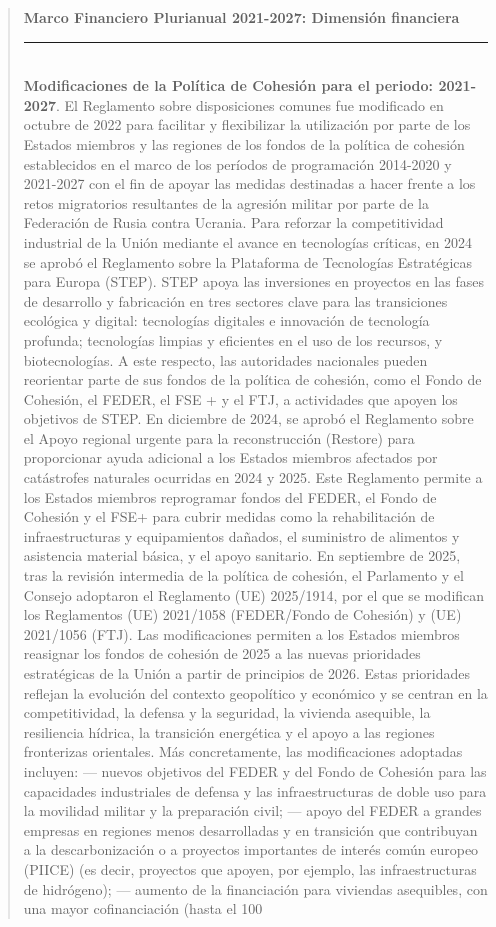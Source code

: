 \documentclass[10pt,a4paper]{article}
\newenvironment{specialblock}[1]{%
      \begin{quote} %
      \small %
      \noindent\textbf{#1}\\[-0.3em] %
      \rule{\linewidth}{0.4pt}\\[0.6em]}{
      \end{quote}}
\begin{document}
\begin{specialblock}{Marco Financiero Plurianual 2021-2027: Dimensión financiera}
    \textbf{Modificaciones de la Política de Cohesión para el periodo: 2021-2027}. El Reglamento sobre disposiciones comunes fue modificado en octubre de 2022 para facilitar y flexibilizar la utilización por parte de los Estados miembros y las regiones de los fondos de la política de cohesión establecidos en el marco de los períodos de programación 2014-2020 y 2021-2027 con el fin de apoyar las medidas destinadas a hacer frente a los retos migratorios resultantes de la agresión militar por parte de la Federación de Rusia contra Ucrania. Para reforzar la competitividad industrial de la Unión mediante el avance en tecnologías críticas, en 2024 se aprobó el Reglamento sobre la Plataforma de Tecnologías Estratégicas para Europa (STEP). STEP apoya las inversiones en proyectos en las fases de desarrollo y fabricación en tres sectores clave para las transiciones ecológica y digital: tecnologías digitales e innovación de tecnología profunda; tecnologías limpias y eficientes en el uso de los recursos, y biotecnologías. A este respecto, las autoridades nacionales pueden reorientar parte de sus fondos de la política de cohesión, como el Fondo de Cohesión, el FEDER, el FSE + y el FTJ, a actividades que apoyen los objetivos de STEP. En diciembre de 2024, se aprobó el Reglamento sobre el Apoyo regional urgente para la reconstrucción (Restore) para proporcionar ayuda adicional a los Estados miembros afectados por catástrofes naturales ocurridas en 2024 y 2025. Este Reglamento permite a los Estados miembros reprogramar fondos del FEDER, el Fondo de Cohesión y el FSE+ para cubrir medidas como la rehabilitación de infraestructuras y equipamientos dañados, el suministro de alimentos y asistencia material básica, y el apoyo sanitario. En septiembre de 2025, tras la revisión intermedia de la política de cohesión, el Parlamento y el Consejo adoptaron el Reglamento (UE) 2025/1914, por el que se modifican los Reglamentos (UE) 2021/1058 (FEDER/Fondo de Cohesión) y (UE) 2021/1056 (FTJ). Las modificaciones permiten a los Estados miembros reasignar los fondos de cohesión de 2025 a las nuevas prioridades estratégicas de la Unión a partir de principios de 2026. Estas prioridades reflejan la evolución del contexto geopolítico y económico y se centran en la competitividad, la defensa y la seguridad, la vivienda asequible, la resiliencia hídrica, la transición energética y el apoyo a las regiones fronterizas orientales. Más concretamente, las modificaciones adoptadas incluyen: — nuevos objetivos del FEDER y del Fondo de Cohesión para las capacidades industriales de defensa y las infraestructuras de doble uso para la movilidad militar y la preparación civil; — apoyo del FEDER a grandes empresas en regiones menos desarrolladas y en transición que contribuyan a la descarbonización o a proyectos importantes de interés común europeo (PIICE) (es decir, proyectos que apoyen, por ejemplo, las infraestructuras de hidrógeno); — aumento de la financiación para viviendas asequibles, con una mayor cofinanciación (hasta el 100 %
\end{specialblock}
\end{document}
